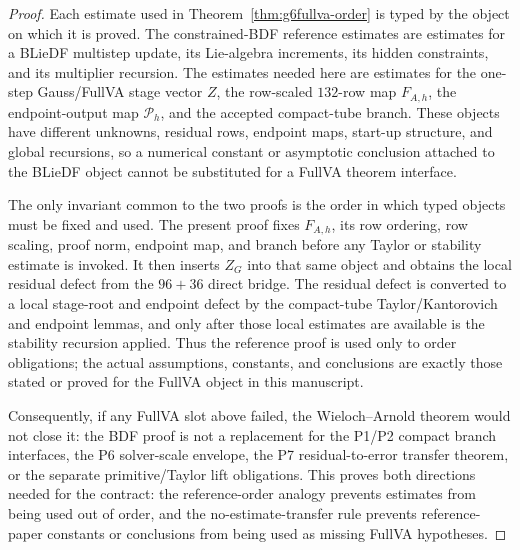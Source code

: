 \documentclass[preprint,12pt]{elsarticle}
\begin{document}
\begin{proof}
Each estimate used in Theorem~\ref{thm:g6fullva-order} is typed by the
object on which it is proved.  The constrained-BDF reference estimates are
estimates for a BLieDF multistep update, its Lie-algebra increments, its
hidden constraints, and its multiplier recursion.  The estimates needed here
are estimates for the one-step Gauss/FullVA stage vector \(Z\), the
row-scaled \(132\)-row map \(F_{A,h}\), the endpoint-output map
\(\mathcal P_h\), and the accepted compact-tube branch.  These objects have
different unknowns, residual rows, endpoint maps, start-up structure, and
global recursions, so a numerical constant or asymptotic conclusion attached
to the BLieDF object cannot be substituted for a FullVA theorem interface.

The only invariant common to the two proofs is the order in which typed
objects must be fixed and used.  The present proof fixes \(F_{A,h}\), its row
ordering, row scaling, proof norm, endpoint map, and branch before any
Taylor or stability estimate is invoked.  It then inserts \(Z_G\) into that
same object and obtains the local residual defect from the \(96+36\) direct
bridge.  The residual defect is converted to a local stage-root and endpoint
defect by the compact-tube Taylor/Kantorovich and endpoint lemmas, and only
after those local estimates are available is the stability recursion applied.
Thus the reference proof is used only to order obligations; the actual
assumptions, constants, and conclusions are exactly those stated or proved for
the FullVA object in this manuscript.

Consequently, if any FullVA slot above failed, the Wieloch--Arnold theorem
would not close it: the BDF proof is not a replacement for the P1/P2 compact
branch interfaces, the P6 solver-scale envelope, the P7 residual-to-error
transfer theorem, or the separate primitive/Taylor lift obligations.  This
proves both directions needed for the contract: the reference-order analogy
prevents estimates from being used out of order, and the no-estimate-transfer
rule prevents reference-paper constants or conclusions from being used as
missing FullVA hypotheses.
\end{proof}
\end{document}
